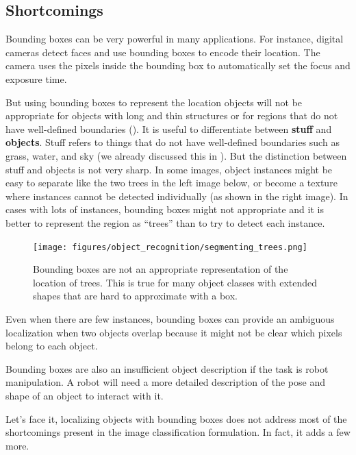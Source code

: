 \subsection{Shortcomings}

Bounding boxes can be very powerful in many applications. For instance, digital cameras detect faces and use bounding boxes to encode their location. The camera uses the pixels inside the bounding box to automatically set the focus and exposure time.

But using bounding boxes to represent the location objects will not be appropriate for objects with long and thin structures or for regions that do not have well-defined boundaries (\fig{\ref{fig:segmenting_trees}}). It is useful to differentiate between {\bf stuff} and {\bf objects}. Stuff refers to things that do not have well-defined boundaries such as grass, water, and sky (we already discussed this in \chap{\ref{chap:textures}}). But the distinction between stuff and objects is not very sharp. In some images, object instances might be easy to separate like the two trees in the left image below, or become a texture where instances cannot be detected individually (as shown in the right image). In cases with lots of instances, bounding boxes might not appropriate and it is better to represent the region as ``trees'' than to try to detect each instance.

\begin{figure}
    \centerline{
        \texttt{[image: figures/object\_recognition/segmenting\_trees.png]}
    }
    \caption{Bounding boxes are not an appropriate representation of the location of trees. This is true for many object classes with extended shapes that are hard to approximate with a box.}
    \label{fig:segmenting_trees}
\end{figure}

Even when there are few instances, bounding boxes can provide an ambiguous localization when two objects overlap because it might not be clear which pixels belong to each object.

Bounding boxes are also an insufficient object description if the task is robot manipulation. A robot will need a more detailed description of the pose and shape of an object to interact with it.

Let's face it, localizing objects with bounding boxes does not address most of the shortcomings present in the image classification formulation. In fact, it adds a few more.


